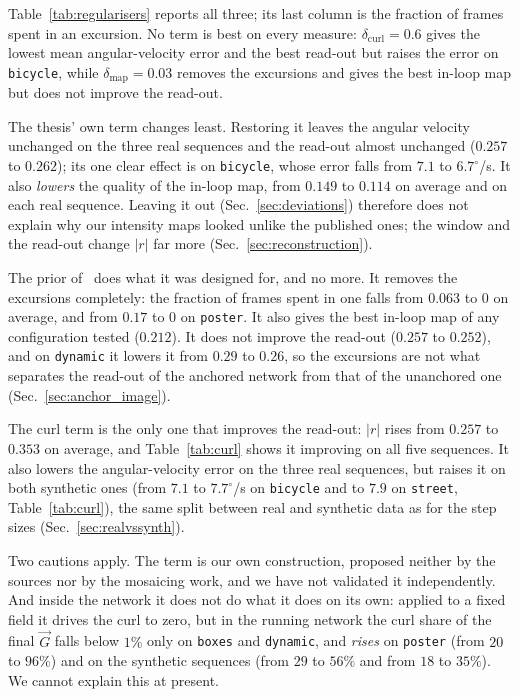 \documentclass[journal]{IEEEtran}
\newcommand{\Gmap}{\vec{G}}
\begin{document}
Table~\ref{tab:regularisers} reports all three; its last column is the fraction of frames spent in an excursion. No term is best on every measure: $\delta_{\text{curl}} = 0.6$ gives the lowest mean angular-velocity error and the best read-out but raises the error on \texttt{bicycle}, while $\delta_{\text{map}} = 0.03$ removes the excursions and gives the best in-loop map but does not improve the read-out.

The thesis' own term changes least. Restoring it leaves the angular velocity unchanged on the three real sequences and the read-out almost unchanged ($0.257$ to $0.262$); its one clear effect is on \texttt{bicycle}, whose error falls from $7.1$ to $6.7^\circ$/s. It also \emph{lowers} the quality of the in-loop map, from $0.149$ to $0.114$ on average and on each real sequence. Leaving it out (Sec.~\ref{sec:deviations}) therefore does not explain why our intensity maps looked unlike the published ones; the window and the read-out change $|r|$ far more (Sec.~\ref{sec:reconstruction}).

The prior of~\cite{guo2024emba} does what it was designed for, and no more. It removes the excursions completely: the fraction of frames spent in one falls from $0.063$ to $0$ on average, and from $0.17$ to $0$ on \texttt{poster}. It also gives the best in-loop map of any configuration tested ($0.212$). It does not improve the read-out ($0.257$ to $0.252$), and on \texttt{dynamic} it lowers it from $0.29$ to $0.26$, so the excursions are not what separates the read-out of the anchored network from that of the unanchored one (Sec.~\ref{sec:anchor_image}).

The curl term is the only one that improves the read-out: $|r|$ rises from $0.257$ to $0.353$ on average, and Table~\ref{tab:curl} shows it improving on all five sequences. It also lowers the angular-velocity error on the three real sequences, but raises it on both synthetic ones (from $7.1$ to $7.7^\circ$/s on \texttt{bicycle} and to $7.9$ on \texttt{street}, Table~\ref{tab:curl}), the same split between real and synthetic data as for the step sizes (Sec.~\ref{sec:realvssynth}).

Two cautions apply. The term is our own construction, proposed neither by the sources nor by the mosaicing work, and we have not validated it independently. And inside the network it does not do what it does on its own: applied to a fixed field it drives the curl to zero, but in the running network the curl share of the final $\Gmap$ falls below $1\%$ only on \texttt{boxes} and \texttt{dynamic}, and \emph{rises} on \texttt{poster} (from $20$ to $96\%$) and on the synthetic sequences (from $29$ to $56\%$ and from $18$ to $35\%$). We cannot explain this at present.
\end{document}
